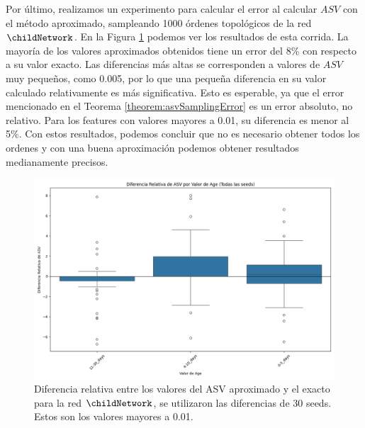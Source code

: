 Por último, realizamos un experimento para calcular el error al calcular $ASV$ con el método aproximado, sampleando 1000 órdenes topológicos de la red $\childNetwork$. En la Figura \ref{fig:boxplotASVApproximateDifferences} podemos ver los resultados de esta corrida. La mayoría de los valores aproximados obtenidos tiene un error del 8\% con respecto a su valor exacto. Las diferencias más altas se corresponden a valores de $ASV$ muy pequeños, como 0.005, por lo que una pequeña diferencia en su valor calculado relativamente es más significativa. Esto es esperable, ya que el error mencionado en el Teorema \ref{theorem:asvSamplingError} es un error absoluto, no relativo. Para los features con valores mayores a 0.01, su diferencia es menor al 5\%.
Con estos resultados, podemos concluir que no es necesario obtener todos los ordenes y con una buena aproximación podemos obtener resultados medianamente precisos. 


\begin{figure}
	\centering
	\includegraphics[width=0.8\linewidth]{img/asvResults/ChildAllSeedsASVBoxplot.png}
	\caption{Diferencia relativa entre los valores del ASV aproximado y el exacto para la red $\childNetwork$, se utilizaron las diferencias de 30 seeds. Estos son los valores mayores a 0.01.}
	\label{fig:boxplotASVApproximateDifferences}
\end{figure}


